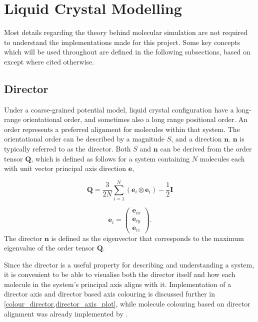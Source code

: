 \section{Liquid Crystal Modelling}
Most details regarding the theory behind molecular simulation are not required to understand the implementations made for this project. Some key concepts which will be used throughout are defined in the following subsections, based on \textcite{allen2017computer} except where cited otherwise.
\subsection{Director}
\label{director_explain}
Under a coarse-grained potential model, liquid crystal configuration have a long-range orientational order, and sometimes also a long range positional order. An order represents a preferred alignment for molecules within that system\cite{dong1997orientational}. The orientational order can be described by a magnitude $S$, and a direction $\mathbf{n}$. $\mathbf{n}$ is typically referred to as the director. Both $S$ and $\mathbf{n}$ can be derived from the order tensor $\mathbf{Q}$, which is defined as follows for a system containing $N$ molecules each with unit vector principal axis direction $\mathbf{e}$,

\begin{equation}
\mathbf{Q}=
\frac{3}{2N}
\sum_{i=1}^{N}
(\mathbf{e}_i
\otimes
\mathbf{e}_i)
-\frac{1}{2}\mathbf{I}
\end{equation}

\begin{equation}
\mathbf{e}_i=\begin{pmatrix}
  \mathbf{e}_{ix}\\
  \mathbf{e}_{iy}\\
  \mathbf{e}_{iz}
\end{pmatrix}.
\label{order_tensor_e}
\end{equation}
The director $\mathbf{n}$ is defined as the eigenvector that corresponds to the maximum eigenvalue of the order tensor $\mathbf{Q}$.

Since the director is a useful property for describing and understanding a system, it is convenient to be able to visualise both the director itself and how each molecule in the system's principal axis aligns with it. Implementation of a director axis and director based axis colouring is discussed further in \cref{colour_director,director_axis_plot}, while molecule colouring based on director alignment was already implemented by \textcite{Battistini_2021}.

